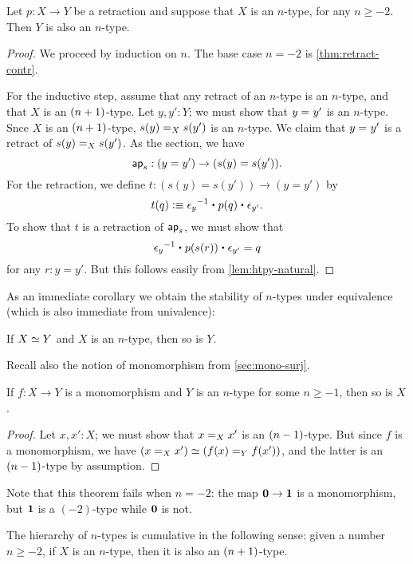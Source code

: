 \begin{thm}\label{thm:h-level-retracts}
 Let $p : X \to Y$ be a retraction and suppose that $X$ is an $n$-type, for any $n\geq -2$.
 Then $Y$ is also an $n$-type.
\end{thm}

\begin{proof}
 We proceed by induction on $n$.
 The base case $n=-2$ is \autoref{thm:retract-contr}.

 For the inductive step, assume that any retract of an $n$-type is an $n$-type, and that $X$ is an $\nplusone$-type.
 Let $y, y' : Y$; we must show that $\id{y}{y'}$ is an $n$-type.
 Snce $X$ is an $\nplusone$-type, $\id[X]{s(y)}{s(y')}$ is an $n$-type.
 We claim that $\id{y}{y'}$ is a retract of $\id[X]{s(y)}{s(y')}$.
 As the section, we have
 \[ \apfunc s : (y=y') \to (s(y)=s(y')). \]
 For the retraction, we define $t:(s(y)=s(y'))\to(y=y')$ by
 \[ t(q) \defeq  \opp{\epsilon_y} \ct \ap p q \ct \epsilon_{y'}.\]
 To show that $t$ is a retraction of $\apfunc s$, we must show that
 \[ \opp{\epsilon_y} \ct \ap p {\ap sr} \ct \epsilon_{y'} = q \]
 for any $r:y=y'$.
 But this follows easily from \autoref{lem:htpy-natural}.
\end{proof}

As an immediate corollary we obtain the stability of $n$-types under equivalence (which is also immediate from univalence):

\begin{cor}\label{cor:preservation-hlevels-weq}
 If $\eqv{X}{Y}$ and $X$ is an $n$-type, then so is $Y$.
\end{cor}

Recall also the notion of monomorphism from \autoref{sec:mono-surj}.

\begin{thm}\label{thm:isntype-mono}
  If $f:X\to Y$ is a monomorphism and $Y$ is an $n$-type for some $n\ge -1$, then so is $X$.
\end{thm}
\begin{proof}
  Let $x,x':X$; we must show that $\id[X]{x}{x'}$ is an $\nminusone$-type.
  But since $f$ is a monomorphism, we have $(\id[X]{x}{x'}) \simeq (\id[Y]{f(x)}{f(x')})$, and the latter is an $\nminusone$-type by assumption.
\end{proof}

Note that this theorem fails when $n=-2$: the map $\emptyt \to \unit$ is a monomorphism, but $\unit$ is a $(-2)$-type while $\emptyt$ is not.

\begin{thm}\label{thm:hlevel-cumulative}
 The hierarchy of $n$-types is cumulative in the following sense:
   given a number $n \geq -2$, if $X$ is an $n$-type, then it is also an $\nplusone$-type.
\end{thm}

